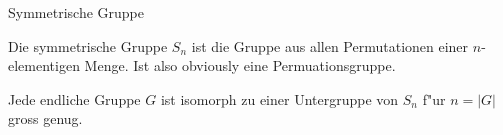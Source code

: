 \documentclass[class=article, crop=false]{standalone}
\begin{document}
\begin{zettel}{Symmetrische Gruppe}
\begin{flashcard}
    \begin{definition}
        Die symmetrische Gruppe $S_n$ ist die Gruppe aus allen Permutationen einer $n$-elementigen Menge. Ist also obviously eine Permuationsgruppe.
    \end{definition}
\end{flashcard}

\begin{theorem}
    Jede endliche Gruppe $G$ ist isomorph zu einer Untergruppe von $S_n$ f"ur $n = |G|$ gross genug.
\end{theorem}
\end{zettel}
\end{document}
